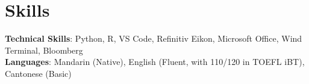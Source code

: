 \documentclass[letterpaper,11pt]{article}
\begin{document}
\section{Skills}
    \begin{itemize}[leftmargin=0.1in, label={}]
        \small{\item{
            \textbf{Technical Skills}{: Python, R, VS Code, Refinitiv Eikon, Microsoft Office, Wind Terminal, Bloomberg} \\
            \textbf{Languages}{: Mandarin (Native), English (Fluent, with 110/120 in TOEFL iBT), Cantonese (Basic)} \\}}
        \end{itemize}
\end{document}
